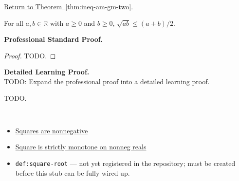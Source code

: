 \newpage
{}
\label{prf:ineq-am-gm-two}

\begin{remark*}[Return]
\hyperref[thm:ineq-am-gm-two]{Return to Theorem~\ref*{thm:ineq-am-gm-two}.}
\end{remark*}

\begin{theorem*}
For all $a, b \in \mathbb{R}$ with $a \ge 0$ and $b \ge 0$,
$\sqrt{ab} \le (a + b)/2$.
\end{theorem*}

\textbf{Professional Standard Proof.}~\\
\begin{proof}
TODO.
\end{proof}

\textbf{Detailed Learning Proof.}~\\
TODO: Expand the professional proof into a detailed learning proof.


\begin{remark*}
TODO.
\end{remark*}

\begin{remark*}[Dependencies]~\\
\begin{itemize}
  \item \hyperref[thm:squares-nonnegative]{Squares are nonnegative}
  \item \hyperref[thm:ineq-square-monotone]{Square is strictly monotone on nonneg reals}
  \item \texttt{def:square-root} --- not yet registered in the repository;
        must be created before this stub can be fully wired up.
\end{itemize}
\end{remark*}
